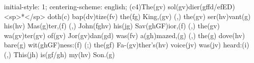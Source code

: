 initial-style: 1;
centering-scheme: english;
(c4)The(gv) sol(gv)dier(gffd/efED) <sp>*</sp> doth(c) bap(dv)tize(fv) the(fg) King,(gv) (,) the(gv) ser(hv)vant(g) his(hv) Mas(g)ter,(f) (,) John(fghv) his(jg) Sav(ghGF)ior,(f) (,) the(gv) wa(gv)ter(gv) of(gv) Jor(gv)dan(gd) was(fv) a(gh)mazed,(g) (,) the(g) dove(hv) bare(g) wit(ghGF)ness:(f) (;) the(gf) Fa-(gv)ther's(hv) voice(jv) was(jv) heard:(i) (,) This(jh) is(gf/gh) my(hv) Son.(g)
